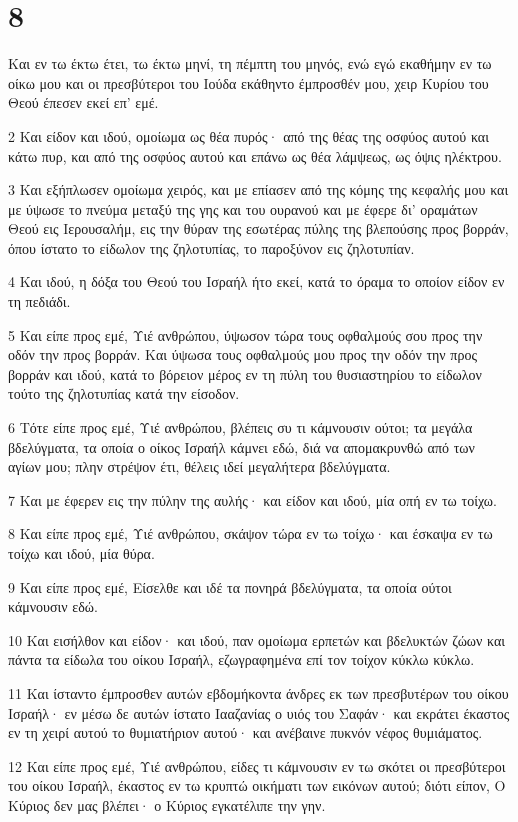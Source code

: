 \chapter{8}

\par Και εν τω έκτω έτει, τω έκτω μηνί, τη πέμπτη του μηνός, ενώ εγώ εκαθήμην εν τω οίκω μου και οι πρεσβύτεροι του Ιούδα εκάθηντο έμπροσθέν μου, χειρ Κυρίου του Θεού έπεσεν εκεί επ' εμέ.
\par 2 Και είδον και ιδού, ομοίωμα ως θέα πυρός· από της θέας της οσφύος αυτού και κάτω πυρ, και από της οσφύος αυτού και επάνω ως θέα λάμψεως, ως όψις ηλέκτρου.
\par 3 Και εξήπλωσεν ομοίωμα χειρός, και με επίασεν από της κόμης της κεφαλής μου και με ύψωσε το πνεύμα μεταξύ της γης και του ουρανού και με έφερε δι' οραμάτων Θεού εις Ιερουσαλήμ, εις την θύραν της εσωτέρας πύλης της βλεπούσης προς βορράν, όπου ίστατο το είδωλον της ζηλοτυπίας, το παροξύνον εις ζηλοτυπίαν.
\par 4 Και ιδού, η δόξα του Θεού του Ισραήλ ήτο εκεί, κατά το όραμα το οποίον είδον εν τη πεδιάδι.
\par 5 Και είπε προς εμέ, Υιέ ανθρώπου, ύψωσον τώρα τους οφθαλμούς σου προς την οδόν την προς βορράν. Και ύψωσα τους οφθαλμούς μου προς την οδόν την προς βορράν και ιδού, κατά το βόρειον μέρος εν τη πύλη του θυσιαστηρίου το είδωλον τούτο της ζηλοτυπίας κατά την είσοδον.
\par 6 Τότε είπε προς εμέ, Υιέ ανθρώπου, βλέπεις συ τι κάμνουσιν ούτοι; τα μεγάλα βδελύγματα, τα οποία ο οίκος Ισραήλ κάμνει εδώ, διά να απομακρυνθώ από των αγίων μου; πλην στρέψον έτι, θέλεις ιδεί μεγαλήτερα βδελύγματα.
\par 7 Και με έφερεν εις την πύλην της αυλής· και είδον και ιδού, μία οπή εν τω τοίχω.
\par 8 Και είπε προς εμέ, Υιέ ανθρώπου, σκάψον τώρα εν τω τοίχω· και έσκαψα εν τω τοίχω και ιδού, μία θύρα.
\par 9 Και είπε προς εμέ, Είσελθε και ιδέ τα πονηρά βδελύγματα, τα οποία ούτοι κάμνουσιν εδώ.
\par 10 Και εισήλθον και είδον· και ιδού, παν ομοίωμα ερπετών και βδελυκτών ζώων και πάντα τα είδωλα του οίκου Ισραήλ, εζωγραφημένα επί τον τοίχον κύκλω κύκλω.
\par 11 Και ίσταντο έμπροσθεν αυτών εβδομήκοντα άνδρες εκ των πρεσβυτέρων του οίκου Ισραήλ· εν μέσω δε αυτών ίστατο Ιααζανίας ο υιός του Σαφάν· και εκράτει έκαστος εν τη χειρί αυτού το θυμιατήριον αυτού· και ανέβαινε πυκνόν νέφος θυμιάματος.
\par 12 Και είπε προς εμέ, Υιέ ανθρώπου, είδες τι κάμνουσιν εν τω σκότει οι πρεσβύτεροι του οίκου Ισραήλ, έκαστος εν τω κρυπτώ οικήματι των εικόνων αυτού; διότι είπον, Ο Κύριος δεν μας βλέπει· ο Κύριος εγκατέλιπε την γην.

